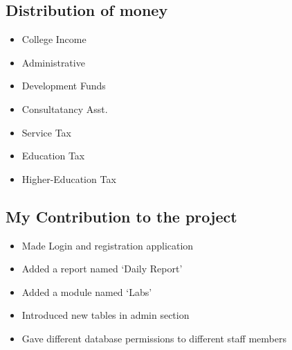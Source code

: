 \subsection{Distribution of money}
\begin{itemize}
\item College Income
\item Administrative
\item Development Funds
\item Consultatancy Asst.
\item Service Tax
\item Education Tax
\item Higher-Education Tax
\end{itemize}
\newpage
\subsection{My Contribution to the project}
\begin{itemize}
\item Made Login and registration application
\item Added a report named `Daily Report'
\item Added a module named `Labs'
\item Introduced new tables in admin section
\item Gave different database permissions to different staff members\\
\end{itemize}

